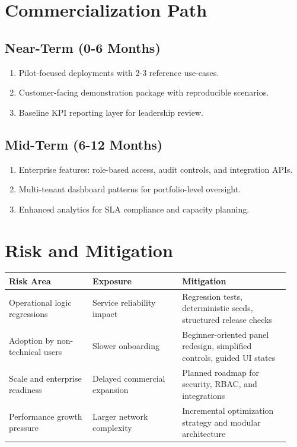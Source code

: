 \documentclass[11pt,a4paper]{article}
\begin{document}
\section{Commercialization Path}
\subsection*{Near-Term (0-6 Months)}
\begin{enumerate}
  \item Pilot-focused deployments with 2-3 reference use-cases.
  \item Customer-facing demonstration package with reproducible scenarios.
  \item Baseline KPI reporting layer for leadership review.
\end{enumerate}

\subsection*{Mid-Term (6-12 Months)}
\begin{enumerate}
  \item Enterprise features: role-based access, audit controls, and integration APIs.
  \item Multi-tenant dashboard patterns for portfolio-level oversight.
  \item Enhanced analytics for SLA compliance and capacity planning.
\end{enumerate}

\section{Risk and Mitigation}
\begin{longtable}{>{\raggedright\arraybackslash}p{0.28\linewidth}p{0.30\linewidth}p{0.36\linewidth}}
\toprule
Risk Area & Exposure & Mitigation \\
\midrule
Operational logic regressions & Service reliability impact & Regression tests, deterministic seeds, structured release checks \\
Adoption by non-technical users & Slower onboarding & Beginner-oriented panel redesign, simplified controls, guided UI states \\
Scale and enterprise readiness & Delayed commercial expansion & Planned roadmap for security, RBAC, and integrations \\
Performance growth pressure & Larger network complexity & Incremental optimization strategy and modular architecture \\
\bottomrule
\end{longtable}
\end{document}
